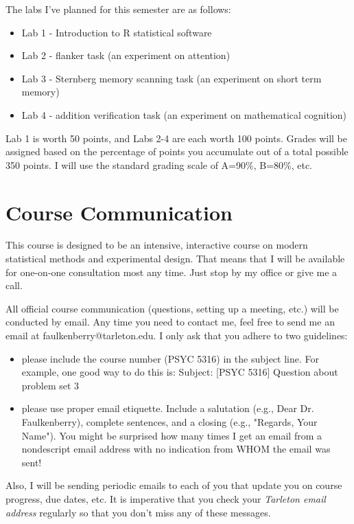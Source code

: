 \documentclass[10pt]{article}
\begin{document}
The labs I've planned for this semester are as follows:

\begin{itemize}
\item Lab 1 - Introduction to R statistical software
\item Lab 2 - flanker task (an experiment on attention)
\item Lab 3 - Sternberg memory scanning task (an experiment on short term memory)
\item Lab 4 - addition verification task (an experiment on mathematical cognition)
\end{itemize}

Lab 1 is worth 50 points, and Labs 2-4 are each worth 100 points. Grades will be assigned based on the percentage of points you accumulate out of a total possible 350 points.  I will use the standard grading scale of A=90\%, B=80\%, etc.

\section*{Course Communication}
\label{sec:org7d2e69d}

This course is designed to be an intensive, interactive course on modern statistical methods and experimental design.  That means that I will be available for one-on-one consultation most any time.  Just stop by my office or give me a call.

All official course communication (questions, setting up a meeting, etc.) will be conducted by email.  Any time you need to contact me, feel free to send me an email at faulkenberry@tarleton.edu.  I only ask that you adhere to two guidelines:
\begin{itemize}
\item please include the course number (PSYC 5316) in the subject line.  For example, one good way to do this is:  Subject: [PSYC 5316] Question about problem set 3
\item please use proper email etiquette.  Include a salutation (e.g., Dear Dr. Faulkenberry), complete sentences, and a closing (e.g., "Regards, Your Name").  You might be surprised how many times I get an email from a nondescript email address with no indication from WHOM the email was sent!
\end{itemize}

Also, I will be sending periodic emails to each of you that update you on course progress, due dates, etc.  It is imperative that you check your \emph{Tarleton email address} regularly so that you don't miss any of these messages.
\end{document}
